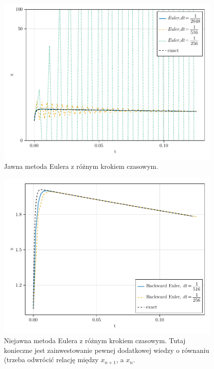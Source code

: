 \documentclass[12pt]{article}
\begin{document}
\begin{figure}
\centering
\includegraphics[width=\textwidth]{euler-methods}
\caption{Jawna metoda Eulera z różnym krokiem czasowym.}
\end{figure}

\begin{figure}
\centering
\includegraphics[width=\textwidth]{BE-methods}
\caption{Niejawna metoda Eulera z różnym krokiem czasowym. Tutaj konieczne jest zainwestowanie pewnej dodatkowej wiedzy o równaniu (trzeba odwrócić relację między $x_{n+1}$, a $x_n$.}
\end{figure}
\end{document}
